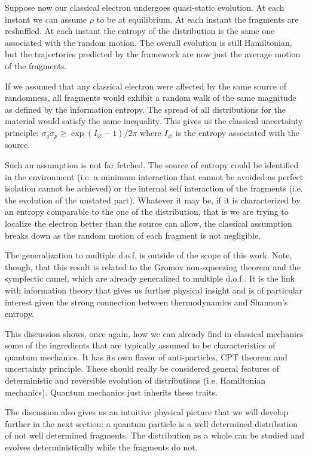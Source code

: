 \documentclass[smallextended]{svjour3}
\numberwithin{equation}{section}
\begin{document}
Suppose now our classical electron undergoes quasi-static evolution. At each instant we can assume $\rho$ to be at equilibrium. At each instant the fragments are reshuffled. At each instant the entropy of the distribution is the same one associated with the random motion. The overall evolution is still Hamiltonian, but the trajectories predicted by the framework are now just the average motion of the fragments. 

If we assumed that any classical electron were affected by the same source of randomness, all fragments would exhibit a random walk of the same magnitude as defined by the information entropy. The spread of all distributions for the material would satisfy the same inequality. This gives us the classical uncertainty principle: $\sigma_q\sigma_p \geq \exp (I_\varnothing - 1) / 2 \pi $ where $I_\varnothing$ is the entropy associated with the source.

Such an assumption is not far fetched. The source of entropy could be identified in the environment (i.e. a minimum interaction that cannot be avoided as perfect isolation cannot be achieved) or the internal self interaction of the fragments (i.e. the evolution of the unstated part). Whatever it may be, if it is characterized by an entropy comparable to the one of the distribution, that is we are trying to localize the electron better than the source can allow, the classical assumption breaks down as the random motion of each fragment is not negligible.

The generalization to multiple d.o.f. is outside of the scope of this work. Note, though, that this result is related to the Gromov non-squeezing theorem and the symplectic camel, which are already generalized to multiple d.o.f.. It is the link with information theory that gives us further physical insight and is of particular interest given the strong connection between thermodynamics and Shannon's entropy.

This discussion shows, once again, how we can already find in classical mechanics some of the ingredients that are typically assumed to be characteristics of quantum mechanics. It has its own flavor of anti-particles, CPT theorem and uncertainty principle. These should really be considered general features of deterministic and reversible evolution of distributions (i.e. Hamiltonian mechanics). Quantum mechanics just inherits these traits.

The discussion also gives us an intuitive physical picture that we will develop further in the next section: a quantum particle is a well determined distribution of not well determined fragments. The distribution as a whole can be studied and evolves deterministically while the fragments do not.
\end{document}
